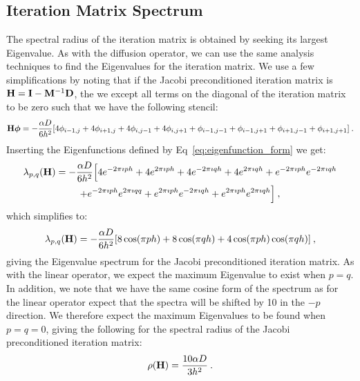 \documentclass[letterpaper,12pt]{article}
\begin{document}
\subsection{Iteration Matrix Spectrum}
The spectral radius of the iteration matrix is obtained by seeking its
largest Eigenvalue. As with the diffusion operator, we can use the
same analysis techniques to find the Eigenvalues for the iteration
matrix. We use a few simplifications by noting that if the Jacobi
preconditioned iteration matrix is $\mathbf{H} = \mathbf{I} -
\mathbf{M}^{-1}\mathbf{D}$, the we except all terms on the diagonal of the
iteration matrix to be zero such that we have the following stencil:
\begin{equation}
  \mathbf{H}\boldsymbol{\phi} = -\frac{\alpha D}{6h^2}[4 \phi_{i-1,j}
    + 4 \phi_{i+1,j} + 4 \phi_{i,j-1} + 4 \phi_{i,j+1} +
    \phi_{i-1,j-1}\\ + \phi_{i-1,j+1} + \phi_{i+1,j-1} +
    \phi_{i+1,j+1}]\:.
  \label{eq:iteration_stencil}
\end{equation}
Inserting the Eigenfunctions defined by Eq~\ref{eq:eigenfunction_form}
we get:
\begin{multline}
  \lambda_{p,q}(\mathbf{H}) = -\frac{\alpha D}{6h^2}\Big[4 e^{-2 \pi \imath p
      h} + 4 e^{2 \pi \imath p h} + 4 e^{-2 \pi \imath q h} + 4 e^{2
      \pi \imath q h} + e^{-2 \pi \imath p h} e^{-2 \pi \imath q h}
    \\ + e^{-2 \pi \imath p h} e^{2 \pi \imath q q} + e^{2 \pi \imath
      p h} e^{-2 \pi \imath q h} + e^{2 \pi \imath p h} e^{2 \pi
      \imath q h}\Big]\:,
  \label{eq:iteration_deriv}
\end{multline}
which simplifies to:
\begin{equation}
  \lambda_{p,q}(\mathbf{H}) = -\frac{\alpha D}{6h^2}[ 8 \cos(\pi p h) + 8
    \cos(\pi q h) + 4 \cos(\pi p h) \cos(\pi q h)]\:,
  \label{eq:iteration_spectrum}
\end{equation}
giving the Eigenvalue spectrum for the Jacobi preconditioned iteration
matrix. As with the linear operator, we expect the maximum Eigenvalue
to exist when $p=q$. In addition, we note that we have the same cosine
form of the spectrum as for the linear operator expect that the
spectra will be shifted by 10 in the $-p$ direction. We therefore
expect the maximum Eigenvalues to be found when $p=q=0$, giving the
following for the spectral radius of the Jacobi preconditioned
iteration matrix:
\begin{equation}
  \rho(\mathbf{H}) = \frac{10 \alpha D}{3 h^2}\:.
  \label{eq:iteration_radius}
\end{equation}
\end{document}
